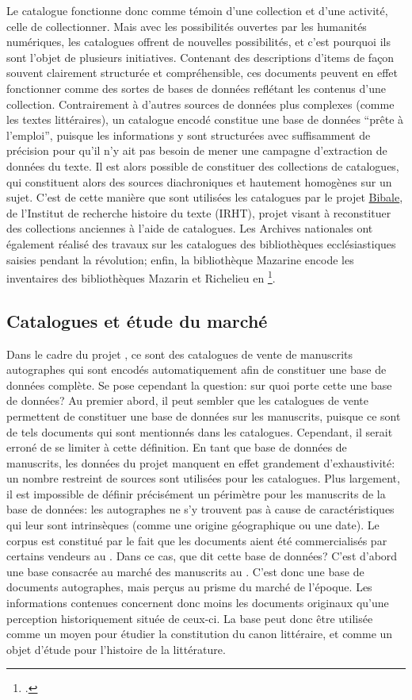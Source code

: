 Le catalogue fonctionne donc comme témoin d'une collection et d'une activité, celle de collectionner. Mais avec les possibilités ouvertes par les humanités numériques, les catalogues offrent de nouvelles possibilités, et c'est pourquoi ils sont l'objet de plusieurs initiatives. Contenant des descriptions d'items de façon souvent clairement structurée et compréhensible, ces documents peuvent en effet fonctionner comme des sortes de bases de données reflétant les contenus d'une collection. Contrairement à d'autres sources de données plus complexes (comme les textes littéraires), un catalogue encodé constitue une base de données \enquote{prête à l'emploi}, puisque les informations y sont structurées avec suffisamment de précision pour qu'il n'y ait pas besoin de mener une campagne d'extraction de données du texte. Il est alors possible de constituer des collections de catalogues, qui constituent alors des sources diachroniques et hautement homogènes sur un sujet. C'est de cette manière que sont utilisées les catalogues par le projet \href{https://bibale.irht.cnrs.fr/}{Bibale}, de l'Institut de recherche histoire du texte (IRHT), projet visant à reconstituer des collections anciennes à l'aide de catalogues. Les Archives nationales ont également réalisé des travaux sur les catalogues des bibliothèques ecclésiastiques saisies pendant la révolution; enfin, la bibliothèque Mazarine encode les inventaires des bibliothèques Mazarin et Richelieu en \xmltei{}\footcite[p. 8-9]{rondeau_du_noyer_encoder_2019}. 

\subsection{Catalogues et étude du marché}
Dans le cadre du projet \mssktb{}, ce sont des catalogues de vente de manuscrits autographes qui sont encodés automatiquement afin de constituer une base de données complète. Se pose cependant la question: sur quoi porte cette une base de données? Au premier abord, il peut sembler que les catalogues de vente permettent de constituer une base de données sur les manuscrits, puisque ce sont de tels documents qui sont mentionnés dans les catalogues. Cependant, il serait erroné de se limiter à cette définition. En tant que base de données de manuscrits, les données du projet \ktb{} manquent en effet grandement d'exhaustivité: un nombre restreint de sources sont utilisées pour les catalogues. Plus largement, il est impossible de définir précisément un périmètre pour les manuscrits de la base de données: les autographes ne s'y trouvent pas à cause de caractéristiques qui leur sont intrinsèques (comme une origine géographique ou une date). Le corpus est constitué par le fait que les documents aient été commercialisés par certains vendeurs au . Dans ce cas, que dit cette base de données? C'est d'abord une base consacrée au marché des manuscrits au . C'est donc une base de documents autographes, mais perçus au prisme du marché de l'époque. Les informations contenues concernent donc moins les documents originaux qu'une perception historiquement située de ceux-ci. La base peut donc être utilisée comme un moyen pour étudier la constitution du canon littéraire, et comme un objet d'étude pour l'histoire de la littérature.

